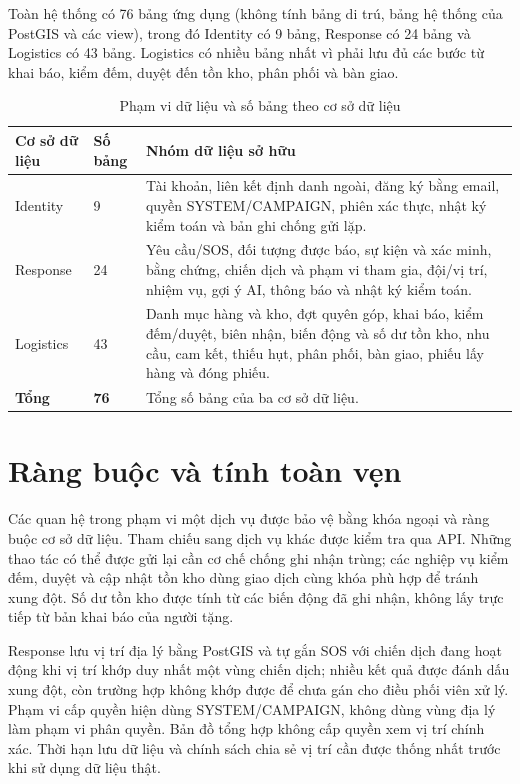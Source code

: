 \documentclass[12pt,a4paper,oneside]{report}
\begin{document}
Toàn hệ thống có 76 bảng ứng dụng (không tính bảng di trú, bảng hệ thống của PostGIS và các view), trong đó Identity có 9 bảng, Response có 24 bảng và Logistics có 43 bảng. Logistics có nhiều bảng nhất vì phải lưu đủ các bước từ khai báo, kiểm đếm, duyệt đến tồn kho, phân phối và bàn giao.

\begin{table}[htbp]
  \centering
  \caption{Phạm vi dữ liệu và số bảng theo cơ sở dữ liệu}\label{tab:data-ownership}
  \small
  \begin{tabularx}{\textwidth}{|L{2.6cm}|L{1.8cm}|Y|}
    \hline
    \centering\textbf{Cơ sở dữ liệu} & \centering\textbf{Số bảng} & \centering\arraybackslash\textbf{Nhóm dữ liệu sở hữu} \\
    \hline
    Identity & 9 & Tài khoản, liên kết định danh ngoài, đăng ký bằng email, quyền SYSTEM/CAMPAIGN, phiên xác thực, nhật ký kiểm toán và bản ghi chống gửi lặp. \\
    \hline
    Response & 24 & Yêu cầu/SOS, đối tượng được báo, sự kiện và xác minh, bằng chứng, chiến dịch và phạm vi tham gia, đội/vị trí, nhiệm vụ, gợi ý AI, thông báo và nhật ký kiểm toán. \\
    \hline
    Logistics & 43 & Danh mục hàng và kho, đợt quyên góp, khai báo, kiểm đếm/duyệt, biên nhận, biến động và số dư tồn kho, nhu cầu, cam kết, thiếu hụt, phân phối, bàn giao, phiếu lấy hàng và đóng phiếu. \\
    \hline
    \textbf{Tổng} & \textbf{76} & Tổng số bảng của ba cơ sở dữ liệu. \\
    \hline
  \end{tabularx}
\end{table}

\section{Ràng buộc và tính toàn vẹn}
Các quan hệ trong phạm vi một dịch vụ được bảo vệ bằng khóa ngoại và ràng buộc cơ sở dữ liệu. Tham chiếu sang dịch vụ khác được kiểm tra qua API. Những thao tác có thể được gửi lại cần cơ chế chống ghi nhận trùng; các nghiệp vụ kiểm đếm, duyệt và cập nhật tồn kho dùng giao dịch cùng khóa phù hợp để tránh xung đột. Số dư tồn kho được tính từ các biến động đã ghi nhận, không lấy trực tiếp từ bản khai báo của người tặng.

Response lưu vị trí địa lý bằng PostGIS và tự gắn SOS với chiến dịch đang hoạt động khi vị trí khớp duy nhất một vùng chiến dịch; nhiều kết quả được đánh dấu xung đột, còn trường hợp không khớp được để chưa gán cho điều phối viên xử lý. Phạm vi cấp quyền hiện dùng SYSTEM/CAMPAIGN, không dùng vùng địa lý làm phạm vi phân quyền. Bản đồ tổng hợp không cấp quyền xem vị trí chính xác. Thời hạn lưu dữ liệu và chính sách chia sẻ vị trí cần được thống nhất trước khi sử dụng dữ liệu thật.
\end{document}
